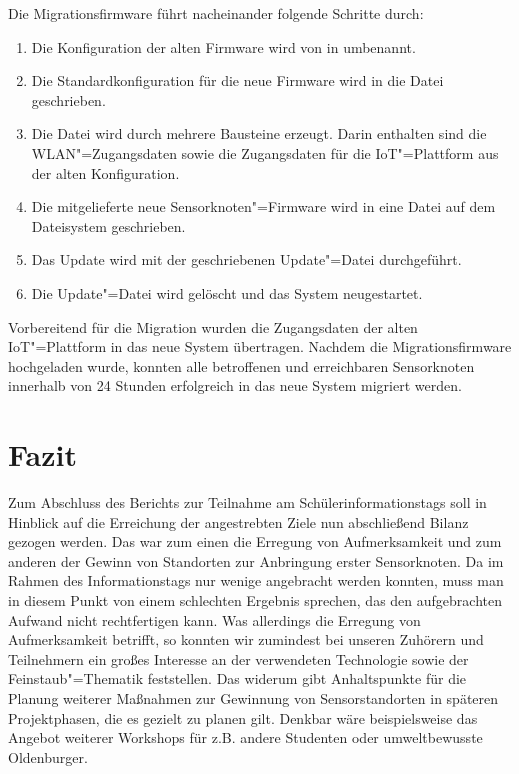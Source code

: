 Die Migrationsfirmware führt nacheinander folgende Schritte durch:

\begin{enumerate}
	\item Die Konfiguration der alten Firmware wird von  in  umbenannt.
	\item Die Standardkonfiguration für die neue Firmware wird in die Datei  geschrieben.
	\item Die Datei  wird durch mehrere Bausteine erzeugt.
	Darin enthalten sind die WLAN"=Zugangsdaten sowie die Zugangsdaten für die IoT"=Plattform aus der alten Konfiguration.
	\item Die mitgelieferte neue Sensorknoten"=Firmware wird in eine Datei auf dem Dateisystem geschrieben.
	\item Das Update wird mit der geschriebenen Update"=Datei durchgeführt.
	\item Die Update"=Datei wird gelöscht und das System neugestartet.
\end{enumerate}

Vorbereitend für die Migration wurden die Zugangsdaten der alten IoT"=Plattform in das neue System übertragen.
Nachdem die Migrationsfirmware hochgeladen wurde, konnten alle betroffenen und erreichbaren Sensorknoten innerhalb von 24 Stunden erfolgreich in das neue System migriert werden.

\section{Fazit}

Zum Abschluss des Berichts zur Teilnahme am Schülerinformationstags soll in Hinblick auf die Erreichung der angestrebten Ziele nun abschließend Bilanz gezogen werden.
Das war zum einen die Erregung von Aufmerksamkeit und zum anderen der Gewinn von Standorten zur Anbringung erster Sensorknoten.
Da im Rahmen des Informationstags nur wenige angebracht werden konnten, muss man in diesem Punkt von einem schlechten Ergebnis sprechen, das den aufgebrachten Aufwand nicht rechtfertigen kann.
Was allerdings die Erregung von Aufmerksamkeit betrifft, so konnten wir zumindest bei unseren Zuhörern und Teilnehmern ein großes Interesse an der verwendeten Technologie sowie der Feinstaub"=Thematik feststellen.
Das widerum gibt Anhaltspunkte für die Planung weiterer Maßnahmen zur Gewinnung von Sensorstandorten in späteren Projektphasen, die es gezielt zu planen gilt.
Denkbar wäre beispielsweise das Angebot weiterer Workshops für z.B. andere Studenten oder umweltbewusste Oldenburger.

